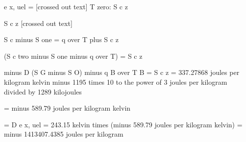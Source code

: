 e x, uel = [crossed out text] T zero: S c z

S c z [crossed out text]

S c minus S one = q over T plus S c z

(S c two minus S one minus q over T) = S c z

minus D (S G minus S O) minus q B over T B = S c z = 337.27868 joules per kilogram kelvin minus 1195 times 10 to the power of 3 joules per kilogram divided by 1289 kilojoules

= minus 589.79 joules per kilogram kelvin

= D e x, uel = 243.15 kelvin times (minus 589.79 joules per kilogram kelvin) = minus 1413407.4385 joules per kilogram